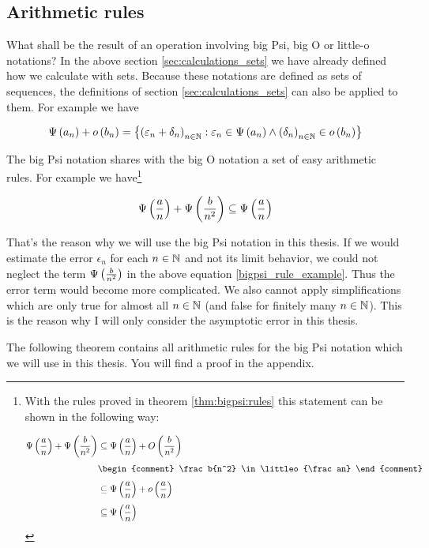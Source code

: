 \subsection{Arithmetic rules}

What shall be the result of an operation involving big Psi, big O or little-o notations? In the above section \ref{sec:calculations_sets} we have already defined how we calculate with sets. Because these notations are defined as sets of sequences, the definitions of section \ref{sec:calculations_sets} can also be applied to them. For example we have

\begin{align}
  \Psi\left( {a_n} \right) + o\left( {b_n} \right) = \left\{ \left({\varepsilon_n+\delta_n}\right)_{{n}\in\mathbb N} : \varepsilon_n \in \Psi\left( {a_n} \right) \land \left({\delta_n}\right)_{{n}\in\mathbb N} \in o\left( {b_n} \right) \right\}
\end{align}

The big Psi notation shares with the big O notation a set of easy arithmetic rules. For example we have\footnote{With the rules proved in theorem \ref{thm:bigpsi:rules} this statement can be shown in the following way:

  \begin{align}
    \bigpsi{\frac an}+\bigpsi{\frac{b}{n^2}} & \subseteq \bigpsi{\frac an} + \bigo{\frac b{n^2}} \nl
    & \begin{comment}
      \frac b{n^2} \in \littleo{\frac an}
    \end{comment} \nl
    & \subseteq \bigpsi{\frac an} + \littleo{\frac an} \nl
    & \subseteq \bigpsi{\frac an}
  \end{align}
}

\begin{align} \label{bigpsi_rule_example}
  \Psi\left( {\frac an} \right)+\Psi\left( {\frac b{n^2}} \right) \subseteq \Psi\left( {\frac an} \right)
\end{align}

That's the reason why we will use the big Psi notation in this thesis. If we would estimate the error $\epsilon_n$ for each $n\in\mathbb N$ and not its limit behavior, we could not neglect the term $\Psi\left( {\frac b{n^2}} \right)$ in the above equation \eqref{bigpsi_rule_example}. Thus the error term would become more complicated. We also cannot apply simplifications which are only true for almost all $n\in\mathbb N$ (and false for finitely many $n\in\mathbb N$). This is the reason why I will only consider the asymptotic error in this thesis.

The following theorem contains all arithmetic rules for the big Psi notation which we will use in this thesis. You will find a proof in the appendix.

